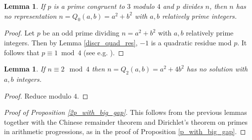 \documentclass[reqno]{amsproc}  %
\newtheorem{lem}[prop]{\bf Lemma}
\begin{document}
\begin{lem} \label{p=3mod4} If  $p$ is a prime  congruent to  $3$ modulo $4$ 
and $p$ divides $n$, then $n$ has no representation
$n = Q_0(a,b)=a^2 + b^2$ with $a,b$ relatively prime integers.
\end{lem}

\begin{proof} Let $p$ be an odd prime dividing $n = a^2 + b^2$
with $a,b$ relatively prime integers.
Then by Lemma \ref{discr_quad_res},
$-1$ is a quadratic residue mod $p$. It follows that
 $p \equiv 1 \bmod 4$ 
(see e.g. \cite[Thm 82]{HaWr}). 
\end{proof}

\begin{lem} If $n \equiv 2 \mod 4$ then
$n = Q_2(a,b) = a^2 + 4 b^2 $ has no solution with $a,b$ integers.
\end{lem}
\begin{proof} Reduce modulo $4$.
\end{proof}

\begin{proof}[Proof of Proposition \ref{2p_with_big_gap}]
This follows from the previous lemmas together with the Chinese remainder theorem and Dirichlet's theorem on primes in arithmetic progressions, as in the proof of Proposition \ref{p_with_big_gap}.
\end{proof}
\end{document}
